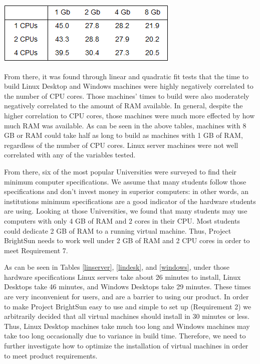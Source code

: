 \documentclass[openright]{report}
\begin{document}
\begin{center}
    \includegraphics[scale=0.93]{DocumentationAndReports/Reports/images/windows.png}
    \label{windows}
\end{center}

\par From there, it was found through linear and quadratic fit tests that the time to build Linux Desktop and Windows machines were highly negatively correlated to the number of CPU cores. Those machines' times to build were also moderately negatively correlated to the amount of RAM available. In general, despite the higher correlation to CPU cores, those machines were much more effected by how much RAM was available. As can be seen in the above tables, machines with 8 GB or RAM could take half as long to build as machines with 1 GB of RAM, regardless of the number of CPU cores. Linux server machines were not well correlated with any of the variables tested. 

\par From there, six of the most popular Universities were surveyed to find their minimum computer specifications. We assume that many students follow those specifications and don't invest money in superior computers: in other words, an institutions minimum specifications are a good indicator of the hardware students are using. Looking at those Universities, we found that many students may use computers with only 4 GB of RAM and 2 cores in their CPU. Most students could dedicate 2 GB of RAM to a running virtual machine. Thus, Project BrightSun needs to work well under 2 GB of RAM and 2 CPU cores in order to meet Requirement 7.

\par As can be seen in Tables \ref{linserver}, \ref{lindesk}, and \ref{windows}, under those hardware specifications Linux servers take about 26 minutes to install, Linux Desktops take 46 minutes, and Windows Desktops take 29 minutes. These times are very inconvenient for users, and are a barrier to using our product. In order to make Project BrightSun easy to use and simple to set up (Requirement 2) we arbitrarily decided that all virtual machines should install in 30 minutes or less. Thus, Linux Desktop machines take much too long and Windows machines may take too long occasionally due to variance in build time. Therefore, we need to further investigate how to optimize the installation of virtual machines in order to meet product requirements. 
\end{document}
